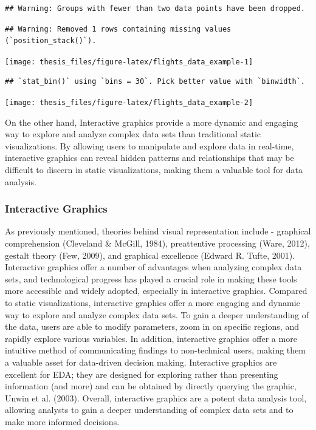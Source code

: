\documentclass[print]{nuthesis}
\begin{document}
\begin{verbatim}
## Warning: Groups with fewer than two data points have been dropped.
\end{verbatim}

\begin{verbatim}
## Warning: Removed 1 rows containing missing values (`position_stack()`).
\end{verbatim}

\begin{center}\texttt{[image: thesis\_files/figure-latex/flights\_data\_example-1]} \end{center}

\begin{verbatim}
## `stat_bin()` using `bins = 30`. Pick better value with `binwidth`.
\end{verbatim}

\begin{center}\texttt{[image: thesis\_files/figure-latex/flights\_data\_example-2]} \end{center}

On the other hand, Interactive graphics provide a more dynamic and engaging way to explore and analyze complex data sets than traditional static visualizations.
By allowing users to manipulate and explore data in real-time, interactive graphics can reveal hidden patterns and relationships that may be difficult to discern in static visualizations, making them a valuable tool for data analysis.

\hypertarget{interactive-graphics}{%
\subsubsection{Interactive Graphics}\label{interactive-graphics}}

As previously mentioned, theories behind visual representation include - graphical comprehension (Cleveland \& McGill, 1984), preattentive processing (Ware, 2012), gestalt theory (Few, 2009), and graphical excellence (Edward R. Tufte, 2001).
Interactive graphics offer a number of advantages when analyzing complex data sets, and technological progress has played a crucial role in making these tools more accessible and widely adopted, especially in interactive graphics.
Compared to static visualizations, interactive graphics offer a more engaging and dynamic way to explore and analyze complex data sets.
To gain a deeper understanding of the data, users are able to modify parameters, zoom in on specific regions, and rapidly explore various variables.
In addition, interactive graphics offer a more intuitive method of communicating findings to non-technical users, making them a valuable asset for data-driven decision making.
Interactive graphics are excellent for EDA; they are designed for exploring rather than presenting information (and more) and can be obtained by directly querying the graphic, Unwin et al. (2003).
Overall, interactive graphics are a potent data analysis tool, allowing analysts to gain a deeper understanding of complex data sets and to make more informed decisions.
\end{document}
